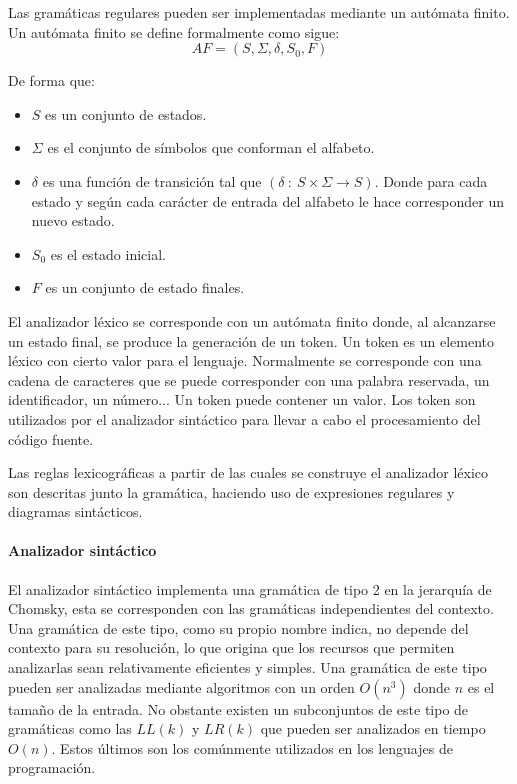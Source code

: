 Las gramáticas regulares pueden ser implementadas mediante un autómata finito. Un autómata finito se define formalmente como sigue:
$$AF = (S,\Sigma,\delta,S_0,F)$$

De forma que:
\begin{itemize}
\item $S$ es un conjunto de estados.
\item $\Sigma$ es el conjunto de símbolos que conforman el alfabeto.
\item $\delta$ es una función de transición tal que $(\delta\ :\ S\times\Sigma \rightarrow S)$. Donde para cada estado y según 
cada carácter de entrada del alfabeto le hace corresponder un nuevo estado.
\item $S_0$ es el estado inicial.
\item $F$ es un conjunto de estado finales.
\end{itemize}

El analizador léxico se corresponde con un autómata finito donde, al alcanzarse un estado final, se produce la generación de un token.
Un token es un elemento léxico con cierto valor para el lenguaje. Normalmente se corresponde con una cadena de
caracteres que se puede corresponder con una palabra reservada, un identificador, un número... Un token puede contener un 
valor. Los token son utilizados por el analizador sintáctico para llevar a cabo el procesamiento del código fuente. 

Las reglas lexicográficas a partir de las cuales se construye el analizador léxico son descritas junto la gramática, haciendo uso
de expresiones regulares y diagramas sintácticos.

\paragraph{Analizador sintáctico}
El analizador sintáctico implementa una gramática de tipo 2 en la jerarquía de Chomsky, esta se corresponden con las 
gramáticas independientes del contexto. Una gramática de este tipo, como su propio nombre indica, no depende del contexto para
su resolución, lo que origina que los recursos que permiten analizarlas sean relativamente eficientes y simples. Una gramática de
este tipo pueden ser analizadas mediante algoritmos con un orden $O(n^3)$ donde $n$ es el tamaño de la entrada. No obstante existen 
un subconjuntos de este tipo de gramáticas como las $LL(k)$ y $LR(k)$ que pueden ser analizados en tiempo $O(n)$. Estos últimos son los
comúnmente utilizados en los lenguajes de programación.

